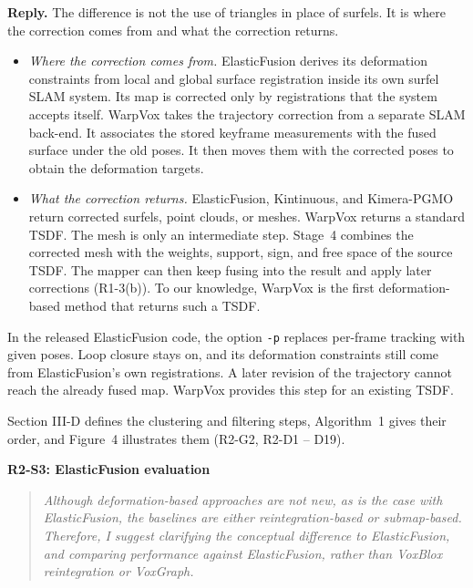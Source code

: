 \documentclass[11pt,a4paper]{article}
\newcommand{\point}[2]{\par\medskip\textbf{#1}\par\begin{quote}\itshape #2\end{quote}}
\newenvironment{reply}{\begingroup\color{replyblue}\textbf{Reply.} }{\par\endgroup}
\begin{document}
\begin{reply}
The difference is not the use of triangles in place of surfels. It is where the correction comes from and what the correction returns.
\begin{itemize}[leftmargin=*,topsep=2pt,itemsep=2pt]
\item \emph{Where the correction comes from.} ElasticFusion derives its deformation constraints from local and global surface registration inside its own surfel SLAM system. Its map is corrected only by registrations that the system accepts itself. WarpVox takes the trajectory correction from a separate SLAM back-end. It associates the stored keyframe measurements with the fused surface under the old poses. It then moves them with the corrected poses to obtain the deformation targets.
\item \emph{What the correction returns.} ElasticFusion, Kintinuous, and Kimera-PGMO return corrected surfels, point clouds, or meshes. WarpVox returns a standard TSDF. The mesh is only an intermediate step. Stage~4 combines the corrected mesh with the weights, support, sign, and free space of the source TSDF. The mapper can then keep fusing into the result and apply later corrections (R1-3(b)). To our knowledge, WarpVox is the first deformation-based method that returns such a TSDF.
\end{itemize}
In the released ElasticFusion code, the option \texttt{-p} replaces per-frame tracking with given poses. Loop closure stays on, and its deformation constraints still come from ElasticFusion's own registrations. A later revision of the trajectory cannot reach the already fused map. WarpVox provides this step for an existing TSDF.

Section III-D defines the clustering and filtering steps, Algorithm~1 gives their order, and Figure~4 illustrates them (R2-G2, R2-D1 -- D19).
\end{reply}
\point{R2-S3: ElasticFusion evaluation}{Although deformation-based approaches are not new, as is the case with ElasticFusion, the baselines are either reintegration-based or submap-based. Therefore, I suggest clarifying the conceptual difference to ElasticFusion, and comparing performance against ElasticFusion, rather than VoxBlox reintegration or VoxGraph.}
\end{document}

